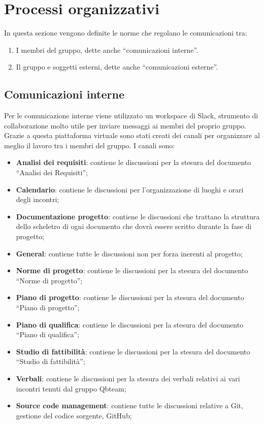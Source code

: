 \section{Processi organizzativi}
In questa sezione vengono definite le norme che regolano le comunicazioni tra:
\begin{enumerate}
	\item I membri del gruppo, dette anche “comunicazioni interne”.
	\item Il gruppo e soggetti esterni, dette anche “comunicazioni esterne”.
	
	\end{enumerate}
	
\subsection{Comunicazioni interne}
Per le comunicazione interne viene utilizzato un workspace di Slack,
strumento di collaborazione molto utile per inviare messaggi ai membri del proprio gruppo.
Grazie a questa piattaforma virtuale sono stati creati dei canali per organizzare al meglio il lavoro tra i membri del gruppo.
I canali sono:
\begin{itemize}
	\item \textbf{Analisi dei requisiti}:  contiene le discussioni per la stesura del documento “Analisi dei Requisiti”;
	\item \textbf{Calendario}: contiene le discussioni per l’organizzazione di luoghi e orari degli incontri;
	\item \textbf{Documentazione progetto}: contiene le discussioni che trattano la struttura dello scheletro di ogni documento che dovrà essere scritto durante la fase di progetto;
	\item \textbf{General}: contiene tutte le discussioni non per forza inerenti al progetto;
	\item \textbf{Norme di progetto}: contiene le discussioni per la stesura del documento “Norme di progetto”;
        \item \textbf{Piano di progetto}: contiene le discussioni per la stesura del documento “Piano di progetto”;
	\item \textbf{Piano di qualifica}: contiene le discussioni per la stesura del documento “Piano di qualifica”;
	\item \textbf{Studio di fattibilità}: contiene le discussioni per la stesura del documento “Studio di fattibilità”;
	\item \textbf{Verbali}: contiene le discussioni per la stesura dei verbali relativi ai vari incontri tenuti dal gruppo Qbteam;
	\item \textbf{Source code management}: contiene tutte le discussioni relative a Git, gestione del codice sorgente, GitHub;
\end{itemize}


